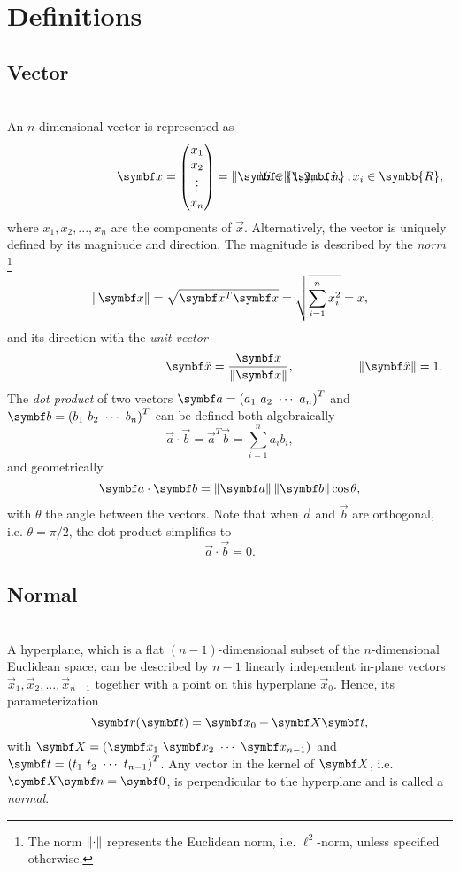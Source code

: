 \section{Definitions}
\label{app:definitions}

\subsection*{Vector}
\cite{dot_product}\\
An $n$-dimensional vector is represented as
\[
\lcr{}{
\vec{x} =
\begin{pmatrix}
x_1 \\ x_2 \\ \vdots \\ x_n
\end{pmatrix} = \norm{\vec{x}} \uvec{x},
}{
\forall i \in \set{1, 2, ..., n}, x_i \in \symbb{R},
}
\]
where $x_1, x_2, ..., x_n$ are the components of $\vec{x}$. Alternatively, the vector is uniquely defined by its magnitude and direction. The magnitude is described by the \emph{norm}%
\footnote{The norm $\left\lVert\cdot\right\rVert$ represents the Euclidean norm, i.e. $\ell^2$-norm, unless specified otherwise.}
\[
\norm{\vec{x}} = \sqrt{\vec{x}^T \vec{x}} = \sqrt{\sum_{i=1}^{n} x_i^2} = x,
\]
and its direction with the \emph{unit vector}
\[
\lcr{}{
\uvec{x} = \frac{\vec{x}}{\norm{\vec{x}}},
}{
\norm{\uvec{x}} = 1.
}
\]
The \emph{dot product} of two vectors $\vec{a} = \inlinemat{a_1, a_2, \cdots, a_n}^T$ and $\vec{b} = \inlinemat{b_1, b_2, \cdots, b_n}^T$ can be defined both algebraically
\[
\vec{a} \cdot \vec{b} = \vec{a}^T \vec{b} = \sum_{i=1}^{n} a_i b_i,
\]
and geometrically
\[
\vec{a} \cdot \vec{b} = \norm{\vec{a}} \norm{\vec{b}} \cos{\theta},
\]
with $\theta$ the angle between the vectors. Note that when $\vec{a}$ and $\vec{b}$ are orthogonal, i.e. $\theta = \pi/2$, the dot product simplifies to
\[
\vec{a} \cdot \vec{b} = 0.
\]

\subsection*{Normal}
\cite{euclidean_space,hyperplane,normal}\\
A hyperplane, which is a flat $(n-1)$-dimensional subset of the $n$-dimensional Euclidean space, can be described by $n-1$ linearly independent in-plane vectors $\vec{x}_1, \vec{x}_2, ..., \vec{x}_{n-1}$ together with a point on this hyperplane $\vec{x}_0$. Hence, its parameterization
\[
\vec{r}(\vec{t}) = \vec{x}_0 + \mat{X} \vec{t},
\]
with $\mat{X} = \inlinemat{\vec{x}_1, \vec{x}_2, \cdots, \vec{x}_{n-1}}$ and $\vec{t} = \inlinemat{t_1, t_2, \cdots, t_{n-1}}^T$. Any vector in the kernel of $\mat{X}$, i.e. $\mat{X} \vec{n} = \vec{0}$, is perpendicular to the hyperplane and is called a \emph{normal}.

